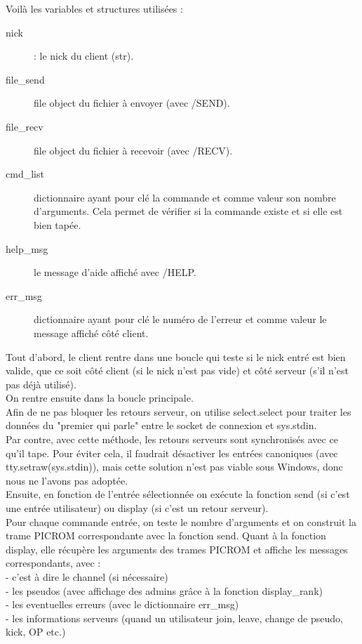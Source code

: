 \documentclass[12pt]{article}
\begin{document}
{Voilà les variables et structures utilisées :
\begin{description}
    \item[nick] : le nick du client (str).
    \item[file\_send] file object du fichier à envoyer (avec /SEND).
    \item[file\_recv] file object du fichier à recevoir (avec /RECV).
    \item[cmd\_list] dictionnaire ayant pour clé la commande et comme valeur son nombre d'arguments. Cela permet de vérifier si la commande existe et si elle est bien tapée.
    \item[help\_msg] le message d'aide affiché avec /HELP.
    \item[err\_msg] dictionnaire ayant pour clé le numéro de l'erreur et comme valeur le message affiché côté client.
\end{description}

Tout d'abord, le client rentre dans une boucle qui teste si le nick entré est bien valide, que ce soit côté client (si le nick n'est pas vide) et côté serveur (s'il n'est pas déjà utilisé).
\\On rentre ensuite dans la boucle principale.
\\Afin de ne pas bloquer les retours serveur, on utilise select.select pour traiter les données du "premier qui parle" entre le socket de connexion et sys.stdin.
\\Par contre, avec cette méthode, les retours serveurs sont synchronisés avec ce qu'il tape. Pour éviter cela, il faudrait désactiver les entrées canoniques (avec tty.setraw(sys.stdin)), mais cette solution n'est pas viable sous Windows, donc nous ne l'avons pas adoptée.
\\Ensuite, en fonction de l'entrée sélectionnée on exécute la fonction send (si c'est une entrée utilisateur) ou display (si c'est un retour serveur).
\\Pour chaque commande entrée, on teste le nombre d'arguments et on construit la trame PICROM correspondante avec la fonction send. 
Quant à la fonction display, elle récupère les arguments des trames PICROM et affiche les messages correspondants, avec : \\
- c'est à dire le channel (si nécessaire)\\
- les pseudos (avec affichage des admins grâce à la fonction display\_rank)\\
- les eventuelles erreurs (avec le dictionnaire err\_msg)\\
- les informations serveurs (quand un utilisateur join, leave, change de pseudo, kick, OP etc.)\\

}
\end{document}
